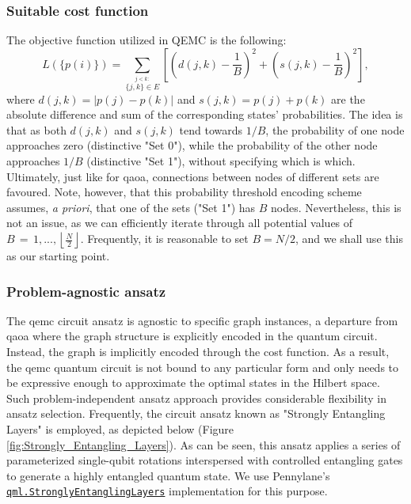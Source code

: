\subsubsection*{\small Suitable cost function}
The objective function utilized in QEMC is the following:
\begin{equation}
L(\{p(i)\}) = \sum_{\stackrel{j < k:}{\{j,k\}\in E}}\left[\left(d(j,k)-\frac{1}{B}\right)^{2}+\left(s(j,k)-\frac{1}{B}\right)^{2}\right],
\end{equation}
where $d(j,k) = |p(j) - p(k)|$ and $s(j, k) = p(j) + p(k)$ are the absolute difference and sum of the corresponding states' probabilities. The idea is that as both $d(j, k)$ and $s(j, k)$ tend towards $1/B$, the probability of one node approaches zero (distinctive "Set 0"), while the probability of the other node approaches $1/B$ (distinctive "Set 1"), without specifying which is which. Ultimately, just like for \acrshort{qaoa}, connections between nodes of different sets are favoured. Note, however, that this probability threshold encoding scheme assumes, \textit{a priori}, that one of the sets ("Set 1") has $B$ nodes. Nevertheless, this is not an issue, as we can efficiently iterate through all potential values of $B\,=\,1,...,\left\lfloor{\frac{N}{2}}\right\rfloor$. Frequently, it is reasonable to set $B = N/2$, and we shall use this as our starting point.

\subsubsection*{\small Problem-agnostic ansatz}
The \acrshort{qemc} circuit ansatz is agnostic to specific graph instances, a departure from \acrshort{qaoa} where the graph structure is explicitly encoded in the quantum circuit. Instead, the graph is implicitly encoded through the cost function. As a result, the \acrshort{qemc} quantum circuit is not bound to any particular form and only needs to be expressive enough to approximate the optimal states in the Hilbert space. Such problem-independent ansatz approach provides considerable flexibility in ansatz selection. Frequently, the circuit ansatz known as "Strongly Entangling Layers" is employed, as depicted below (Figure \ref{fig:Strongly_Entangling_Layers}). As can be seen, this ansatz applies a series of parameterized single-qubit rotations interspersed with controlled entangling gates to generate a highly entangled quantum state. We use Pennylane's \href{https://docs.pennylane.ai/en/stable/code/api/pennylane.StronglyEntanglingLayers.html}{\texttt{qml.StronglyEntanglingLayers}} implementation for this purpose.

